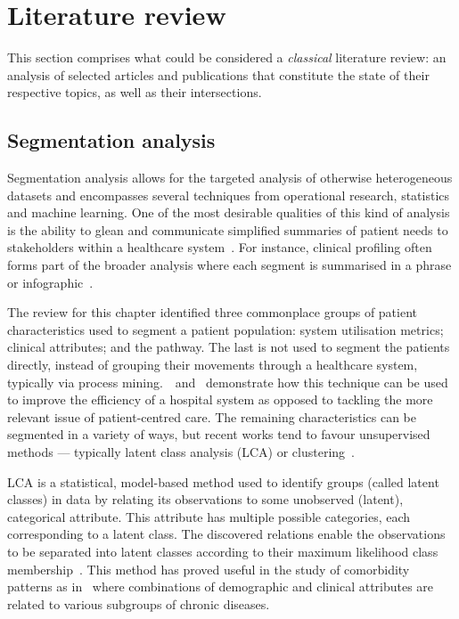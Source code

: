 \section{Literature review}\label{sec:review}

This section comprises what could be considered a \emph{classical} literature
review: an analysis of selected articles and publications that constitute the
state of their respective topics, as well as their intersections.

\subsection{Segmentation analysis}

Segmentation analysis allows for the targeted analysis of otherwise
heterogeneous datasets and encompasses several techniques from operational
research, statistics and machine learning. One of the most desirable qualities
of this kind of analysis is the ability to glean and communicate simplified
summaries of patient needs to stakeholders within a healthcare
system~\cite{Vuik2016b, Yoon2020}. For instance, clinical profiling often forms
part of the broader analysis where each segment is summarised in a phrase or
infographic~\cite{Vuik2016a, Yan2019}.

The review for this chapter identified three commonplace groups of patient
characteristics used to segment a patient population: system utilisation
metrics; clinical attributes; and the pathway. The last is not used to segment
the patients directly, instead of grouping their movements through a healthcare
system, typically via process mining.~\cite{Arnolds2018}~and~\cite{Delias2015}
demonstrate how this technique can be used to improve the efficiency of a
hospital system as opposed to tackling the more relevant issue of
patient-centred care. The remaining characteristics can be segmented in a
variety of ways, but recent works tend to favour unsupervised methods —
typically latent class analysis (LCA) or clustering~\cite{Yan2018}.

LCA is a statistical, model-based method used to identify groups (called latent
classes) in data by relating its observations to some unobserved (latent),
categorical attribute. This attribute has multiple possible categories, each
corresponding to a latent class. The discovered relations enable the
observations to be separated into latent classes according to their maximum
likelihood class membership~\cite{Hagenaars2002,Lazarsfeld1968}. This method has
proved useful in the study of comorbidity patterns as
in~\cite{Kuwornu2014,Larsen2017} where combinations of demographic and clinical
attributes are related to various subgroups of chronic diseases.

